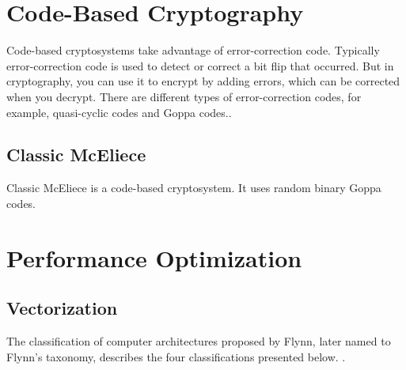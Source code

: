 
\section{Code-Based Cryptography}
Code-based cryptosystems take advantage of error-correction code. Typically error-correction code is used to detect or correct a bit flip that occurred. But in cryptography, you can use it to encrypt by adding errors, which can be corrected when you decrypt\cite{bernstein2017}. There are different types of error-correction codes, for example, quasi-cyclic codes and Goppa codes.\cite{sendrier2011}.

\subsection{Classic McEliece}
Classic McEliece is a code-based cryptosystem. It uses random binary Goppa codes.




\section{Performance Optimization}


\subsection{Vectorization}

The classification of computer architectures proposed by Flynn, later named to Flynn's taxonomy, describes the four classifications presented below. \cite{flynn1972}.

